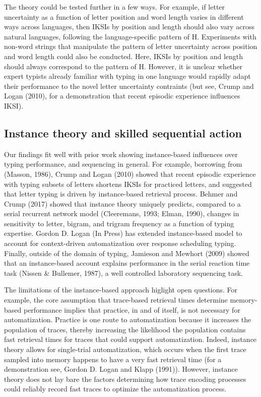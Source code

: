 \documentclass[floatsintext,man]{apa6}
\theoremstyle{definition}
\theoremstyle{definition}
\theoremstyle{definition}
\theoremstyle{remark}
\begin{document}
The theory could be tested further in a few ways. For example, if letter
uncertainty as a function of letter position and word length varies in
different ways across languages, then IKSIs by position and length
should also vary across natural languages, following the
language-specific pattern of H. Experiments with non-word strings that
manipulate the pattern of letter uncertainty across position and word
length could also be conducted. Here, IKSIs by position and length
should always correspond to the pattern of H. However, it is unclear
whether expert typists already familiar with typing in one language
would rapidly adapt their performance to the novel letter uncertainty
contraints (but see, Crump and Logan (2010), for a demonstration that
recent episodic experience influences IKSI).

\subsection{Instance theory and skilled sequential
action}\label{instance-theory-and-skilled-sequential-action}

Our findings fit well with prior work showing instance-based influences
over typing performance, and sequencing in general. For example,
borrowing from (Masson, 1986), Crump and Logan (2010) showed that recent
episodic experience with typing subsets of letters shortens IKSIs for
practiced letters, and suggested that letter typing is driven by
instance-based retrieval process. Behmer and Crump (2017) showed that
instance theory uniquely predicts, compared to a serial recurrent
network model (Cleeremans, 1993; Elman, 1990), changes in sensitivity to
letter, bigram, and trigram frequency as a function of typing expertise.
Gordon D. Logan (In Press) has extended instance-based model to account
for context-driven automatization over response scheduling typing.
Finally, outside of the domain of typing, Jamieson and Mewhort (2009)
showed that an instance-based account explains performance in the serial
reaction time task (Nissen \& Bullemer, 1987), a well controlled
laboratory sequencing task.

The limitations of the instance-based approach higlight open questions.
For example, the core assumption that trace-based retrieval times
determine memory-based performance implies that practice, in and of
itself, is not necessary for automatization. Practice is one route to
automatization because it increases the population of traces, thereby
increasing the likelihood the population contains fast retrieval times
for traces that could support automatization. Indeed, instance theory
allows for single-trial automatization, which occurs when the first
trace sampled into memory happens to have a very fast retrieval time
(for a demonstration see, Gordon D. Logan and Klapp (1991)). However,
instance theory does not lay bare the factors determining how trace
encoding processes could reliably record fast traces to optimize the
automatization process.
\end{document}
